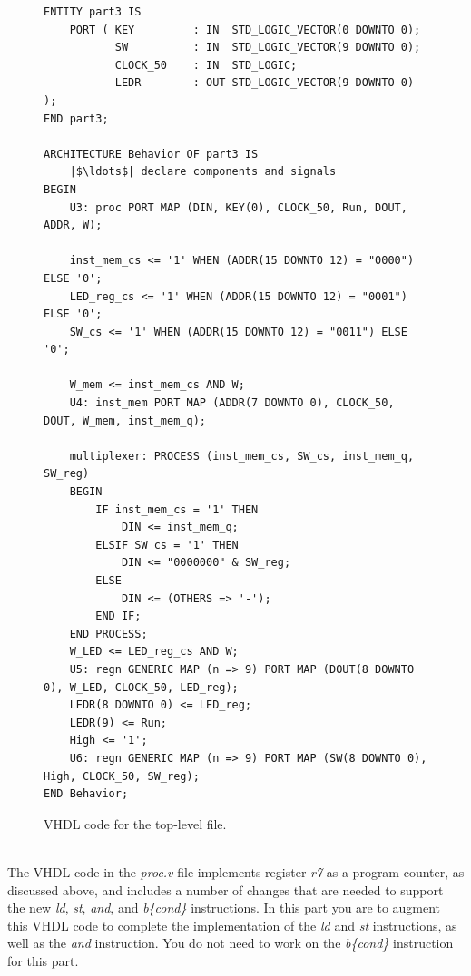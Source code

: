 \documentclass[epsfig,10pt,fullpage]{article}
\begin{document}
\lstset{language=VHDL,numbers=none,escapechar=|}
\begin{figure}[h]
\begin{center}
\begin{minipage}[h]{\textwidth}
\begin{lstlisting}[name=proc]
ENTITY part3 IS 
    PORT ( KEY         : IN  STD_LOGIC_VECTOR(0 DOWNTO 0);
           SW          : IN  STD_LOGIC_VECTOR(9 DOWNTO 0);
           CLOCK_50    : IN  STD_LOGIC;
           LEDR        : OUT STD_LOGIC_VECTOR(9 DOWNTO 0) );
END part3;

ARCHITECTURE Behavior OF part3 IS
    |$\ldots$| declare components and signals
BEGIN
    U3: proc PORT MAP (DIN, KEY(0), CLOCK_50, Run, DOUT, ADDR, W);

    inst_mem_cs <= '1' WHEN (ADDR(15 DOWNTO 12) = "0000") ELSE '0';
    LED_reg_cs <= '1' WHEN (ADDR(15 DOWNTO 12) = "0001") ELSE '0';
    SW_cs <= '1' WHEN (ADDR(15 DOWNTO 12) = "0011") ELSE '0';

    W_mem <= inst_mem_cs AND W;
    U4: inst_mem PORT MAP (ADDR(7 DOWNTO 0), CLOCK_50, DOUT, W_mem, inst_mem_q);

    multiplexer: PROCESS (inst_mem_cs, SW_cs, inst_mem_q, SW_reg)
    BEGIN
        IF inst_mem_cs = '1' THEN
            DIN <= inst_mem_q;
        ELSIF SW_cs = '1' THEN
            DIN <= "0000000" & SW_reg;
        ELSE
            DIN <= (OTHERS => '-');
        END IF;
    END PROCESS;
    W_LED <= LED_reg_cs AND W;
    U5: regn GENERIC MAP (n => 9) PORT MAP (DOUT(8 DOWNTO 0), W_LED, CLOCK_50, LED_reg);
    LEDR(8 DOWNTO 0) <= LED_reg;
    LEDR(9) <= Run;
    High <= '1';
    U6: regn GENERIC MAP (n => 9) PORT MAP (SW(8 DOWNTO 0), High, CLOCK_50, SW_reg);
END Behavior;
\end{lstlisting}
\end{minipage}
\caption{VHDL code for the top-level file.}
\label{fig:top}
\end{center}
\end{figure}

~\\
\noindent
The VHDL code in the {\it proc.v} file implements register {\it r7} as a program counter,
as discussed above, and includes a number of changes that are needed to support the 
new {\it ld}, {\it st}, {\it and}, and {\it b\{cond\}} instructions. In this part you are to 
augment this VHDL code to complete the implementation of the {\it ld} and
{\it st} instructions, as well as the {\it and} instruction. You do not 
need to work on the {\it b\{cond\}} instruction for this part. 
\end{document}
